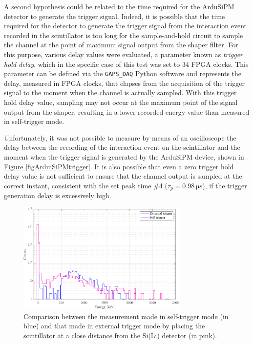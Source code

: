 \par
A second hypothesis could be related to the time required for the ArduSiPM detector to generate the trigger signal. Indeed, it is possible that the time required for the detector to generate the trigger signal from the interaction event recorded in the scintillator is too long for the sample-and-hold circuit to sample the channel at the point of maximum signal output from the shaper filter. For this purpose, various delay values were evaluated, a parameter known as \textit{trigger hold delay}, which in the specific case of this test was set to 34 FPGA clocks. This parameter can be defined via the \texttt{GAPS\_DAQ} Python software and represents the delay, measured in FPGA clocks, that elapses from the acquisition of the trigger signal to the moment when the channel is actually sampled. With this trigger hold delay value, sampling may not occur at the maximum point of the signal output from the shaper, resulting in a lower recorded energy value than measured in self-trigger mode. 

\par
Unfortunately, it was not possible to measure by means of an oscilloscope the delay between the recording of the interaction event on the scintillator and the moment when the trigger signal is generated by the ArduSiPM device, shown in \hyperref[figArduiSiPMtrigger]{Figure \ref{figArduiSiPMtrigger}}. It is also possible that even a zero trigger hold delay value is not sufficient to ensure that the channel output is sampled at the correct instant, consistent with the set peak time \#4 ($\tau_{p} = \SI{0.98}{\micro\second}$), if the trigger generation delay is excessively high.

\begin{figure}[h!]
    \centering
    \includegraphics[width=0.75\textwidth]{Images/chap3/results/muons/ext_self_muons_THR_130_delay_34_ch0-7_keV.pdf} %
    \caption{Comparison between the measurement made in self-trigger mode (in blue) and that made in external trigger mode by placing the scintillator at a close distance from the Si(Li) detector (in pink).}
    \label{figMUONselfExtComparativaCH0-7}
\end{figure}

